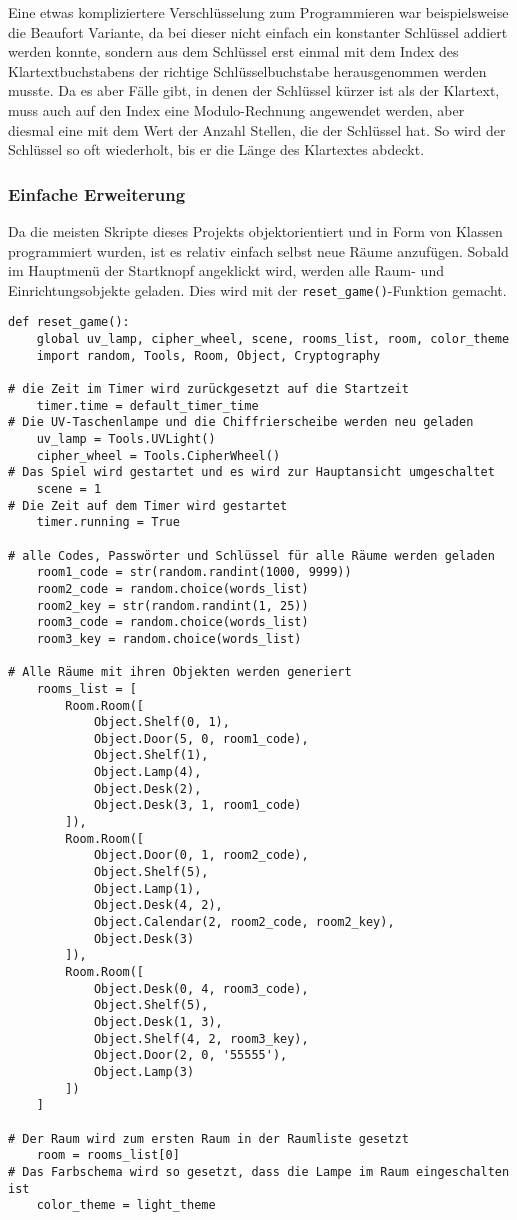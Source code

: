 Eine etwas kompliziertere Verschlüsselung zum Programmieren war beispielsweise die Beaufort Variante, da bei dieser nicht einfach ein konstanter Schlüssel addiert werden konnte, sondern aus dem Schlüssel erst einmal mit dem Index des Klartextbuchstabens der richtige Schlüsselbuchstabe herausgenommen werden musste. Da es aber Fälle gibt, in denen der Schlüssel kürzer ist als der Klartext, muss auch auf den Index eine Modulo-Rechnung angewendet werden, aber diesmal eine mit dem Wert der Anzahl Stellen, die der Schlüssel hat. So wird der Schlüssel so oft wiederholt, bis er die Länge des Klartextes abdeckt.

\subsubsection{Einfache Erweiterung}
Da die meisten Skripte dieses Projekts objektorientiert und in Form von Klassen programmiert wurden, ist es relativ einfach selbst neue Räume anzufügen. Sobald im Hauptmenü der Startknopf angeklickt wird, werden alle Raum- und Einrichtungsobjekte geladen. Dies wird mit der \verb+reset_game()+-Funktion gemacht. 

\begin{Verbatim}
def reset_game():
    global uv_lamp, cipher_wheel, scene, rooms_list, room, color_theme
    import random, Tools, Room, Object, Cryptography

# die Zeit im Timer wird zurückgesetzt auf die Startzeit
    timer.time = default_timer_time 
# Die UV-Taschenlampe und die Chiffrierscheibe werden neu geladen
    uv_lamp = Tools.UVLight()
    cipher_wheel = Tools.CipherWheel() 
# Das Spiel wird gestartet und es wird zur Hauptansicht umgeschaltet
    scene = 1 
# Die Zeit auf dem Timer wird gestartet
    timer.running = True 

# alle Codes, Passwörter und Schlüssel für alle Räume werden geladen
    room1_code = str(random.randint(1000, 9999))
    room2_code = random.choice(words_list)
    room2_key = str(random.randint(1, 25))
    room3_code = random.choice(words_list)
    room3_key = random.choice(words_list) 

# Alle Räume mit ihren Objekten werden generiert
    rooms_list = [ 
        Room.Room([
            Object.Shelf(0, 1),
            Object.Door(5, 0, room1_code),
            Object.Shelf(1),
            Object.Lamp(4),
            Object.Desk(2),
            Object.Desk(3, 1, room1_code)
        ]),
        Room.Room([
            Object.Door(0, 1, room2_code),
            Object.Shelf(5),
            Object.Lamp(1),
            Object.Desk(4, 2),
            Object.Calendar(2, room2_code, room2_key),
            Object.Desk(3)
        ]),
        Room.Room([
            Object.Desk(0, 4, room3_code),
            Object.Shelf(5),
            Object.Desk(1, 3),
            Object.Shelf(4, 2, room3_key),
            Object.Door(2, 0, '55555'),
            Object.Lamp(3)
        ])
    ]

# Der Raum wird zum ersten Raum in der Raumliste gesetzt
    room = rooms_list[0] 
# Das Farbschema wird so gesetzt, dass die Lampe im Raum eingeschalten ist
    color_theme = light_theme
\end{Verbatim}

